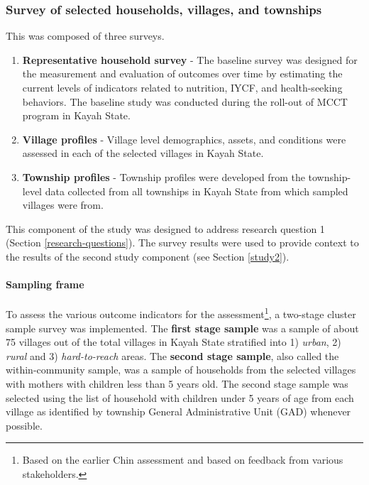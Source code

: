 \documentclass[12pt,a4paper]{article}
\let\oldparagraph\paragraph
\renewcommand{\paragraph}[1]{\oldparagraph{#1}\mbox{}}
\let\rmarkdownfootnote\footnote%
\def\footnote{\protect\rmarkdownfootnote}
\begin{document}
\hypertarget{study1}{%
\subsubsection{Survey of selected households, villages, and townships}\label{study1}}

This was composed of three surveys.

\begin{enumerate}
\def\labelenumi{\arabic{enumi}.}
\item
  \textbf{Representative household survey} - The baseline survey was designed for the measurement and evaluation of outcomes over time by estimating the current levels of indicators related to nutrition, IYCF, and health-seeking behaviors. The baseline study was conducted during the roll-out of MCCT program in Kayah State.
\item
  \textbf{Village profiles} - Village level demographics, assets, and conditions were assessed in each of the selected villages in Kayah State.
\item
  \textbf{Township profiles} - Township profiles were developed from the township-level data collected from all townships in Kayah State from which sampled villages were from.
\end{enumerate}

This component of the study was designed to address research question 1 (Section \ref{research-questions}). The survey results were used to provide context to the results of the second study component (see Section \ref{study2}).

\hypertarget{sampling-frame}{%
\paragraph{Sampling frame}\label{sampling-frame}}

To assess the various outcome indicators for the assessment\footnote{Based on the earlier Chin assessment and based on feedback from various stakeholders.}, a two-stage cluster sample survey was implemented. The \textbf{first stage sample} was a sample of about 75 villages out of the total villages in Kayah State stratified into 1) \emph{urban}, 2) \emph{rural} and 3) \emph{hard-to-reach} areas. The \textbf{second stage sample}, also called the within-community sample, was a sample of households from the selected villages with mothers with children less than 5 years old. The second stage sample was selected using the list of household with children under 5 years of age from each village as identified by township General Administrative Unit (GAD) whenever possible.
\end{document}
